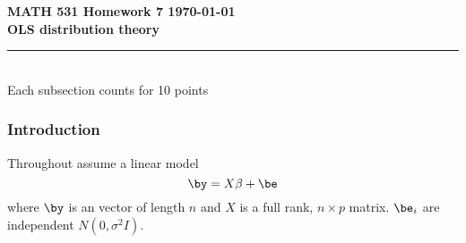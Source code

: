 \documentclass[10pt]{report}
\begin{document}
\vspace*{-1in}
\noindent
{\LARGE  \bf  \sc  MATH 531  Homework 7  \hfill  \today \\
  }
\noindent
{\Large \bf OLS distribution theory    } 
\ \\
{\color{orange3} \hrule  }
\ \\
Each subsection counts for 10 points   


 \subsubsection*{Introduction}
 Throughout assume a linear model 
\[  \by = X \beta + \be \]
where $\by$ is an vector of length $n$ and $X$ is a full rank,
 $n\times p$ matrix. $\be_i$ are independent $N(0,\sigma^2I)$. 
\end{document}

